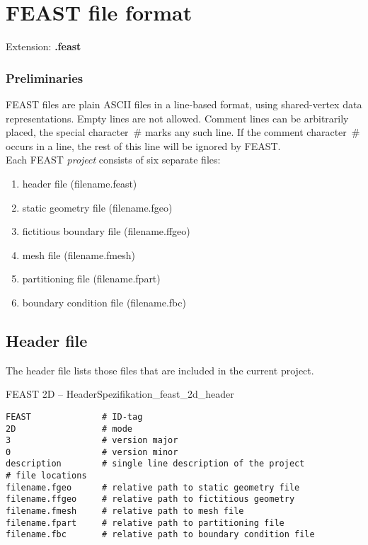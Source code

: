 
\section{FEAST file format}

Extension: {\bf .feast}  

   
\subsubsection*{Preliminaries}
FEAST files are plain ASCII files in a line-based format, using shared-vertex data representations. Empty lines are not allowed. 
Comment lines can be arbitrarily placed, the special character~\# marks any such line. If the comment 
character~\# occurs in a line, the rest of this line will be ignored by FEAST.\\

Each FEAST \emph{project} consists of six separate files:
\begin{enumerate}
\item header file (filename.feast)
\item static geometry file (filename.fgeo)
\item fictitious boundary file (filename.ffgeo)
\item mesh file (filename.fmesh)
\item partitioning file (filename.fpart)
\item boundary condition file (filename.fbc)
\end{enumerate}




\subsection*{Header file}

The header file lists those files that are included in the current project.

\begin{code}{FEAST 2D -- Header}{Spezifikation_feast_2d_header}
\begin{verbatim}       
FEAST              # ID-tag
2D                 # mode
3                  # version major
0                  # version minor
description        # single line description of the project
# file locations
filename.fgeo      # relative path to static geometry file
filename.ffgeo     # relative path to fictitious geometry
filename.fmesh     # relative path to mesh file
filename.fpart     # relative path to partitioning file
filename.fbc       # relative path to boundary condition file
\end{verbatim}
\end{code}

